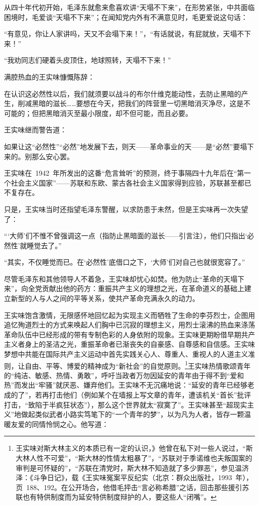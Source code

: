 从四十年代初开始，毛泽东就愈来愈喜欢讲“天塌不下来”，在形势紧张，中共面临困境时，毛爱谈“天塌不下来”；在闻知党内外有不满意见时，毛更爱说这句话：

“有意见，你让人家讲吗，天又不会塌下来！”，“有话就说，有屁就放，天塌不下来！”

“我劝同志们硬着头皮顶住，地球照转，天塌不下来！”

满腔热血的王实味慷慨陈辞：

\begin{quoting}
在认识这必然性以后，我们就须要以战斗的布尔什维克能动性，去防止黑暗的产生，削减黑暗的滋长……要想在今天，把我们的阵营里一切黑暗消灭净尽，这是不可能的；但把黑暗消灭至最小限度，却不但可能，而且必要。
\end{quoting}

王实味继而警告道：

\begin{quoting}
如果让这“必然性”“必然”地发展下去，则天——革命事业的天——是“必然”要塌下来的。别那么安心罢。
\end{quoting}

王实味在~1942~年所发出的这番“危言耸听”的预测，终于事隔四十九年后在“第一个社会主义国家”——苏联和东欧、蒙古各社会主义国家得到应验，苏联甚至都已不复存在。

只是，王实味当时还指望毛泽东警醒，以求防患于未然，但是王实味再一次失望了：

“‘大师’们不惟不曾强调这一点（指防止黑暗面的滋长——引言注），他们只指出‘必然性’就睡觉去了。”

“其实，不仅睡觉而已。在‘必然性’底借口之下，‘大师’们对自己也就很宽容了。”

尽管毛泽东和其他领导人不着急，王实味却忧心如焚。他为防止“革命的天塌下来”，向全党贡献出他的药方：重振共产主义的理想之光，在革命道义的基础上建立新型的人与人之间的平等关系，使共产革命充满永久的动力。

王实味饱含激情，无限感怀地回忆起为实现主义而牺牲了生命的李芬烈士，企图用追忆殉道烈士的方式来唤起人们胸中已沉寂的理想主义，用烈士滚沸的热血来涤荡革命队伍中已经形成的带有专制色彩的人身依附的现象。王实味更期盼借早期共产主义者身上的圣洁之光，重振革命者已渐丧失的自豪感、自尊感和自信感。王实味梦想中共能在国际共产主义运动中首先实践关心人、尊重人、重视人的人道主义准则，让自由、平等、博爱的精神成为“新社会”的自觉原则。\footnote{王实味对斯大林主义的本质已有一定的认识，》他曾在私下对一些人说过，“斯大林人性不可爱”，“斯大林的性情太粗暴了”，“苏联对于季诺维也夫叛国案的审判是可怀疑的”，“苏联在清党时，斯大林不知造就了多少罪恶”，参见温济泽：《斗争日记》，载《王实味冤案平反纪实（北京：群众出版社，1993~年），页~188、192。在公开场合，他借毛抨击“言必称希腊”之话，回击那些援引苏联也有特供制度而为延安特供制度辩护的人，要这些人“闭嘴”。}王实味热情歌颂青年的“纯洁、敏感、热情、勇敢”，呼吁当政者万勿因延安的青年由于得不到“爱和热”而发出“牢骚”就厌恶、嫌弃他们。王实味不无沉痛地说：“延安的青年已经够老成的了”，若再打击他们（例如某个在墙报上写文章的青年，遭该机关“首长”批评打击，“致陷于半疯狂状态”），那么这个世界就太“寂寞了”。王实味甚至“超现实主义”地做起类似武者小路实笃笔下的“一个青年的梦”，以为凡为人者，皆存一颗温暖友爱的同情怜悯之心。他写道：

